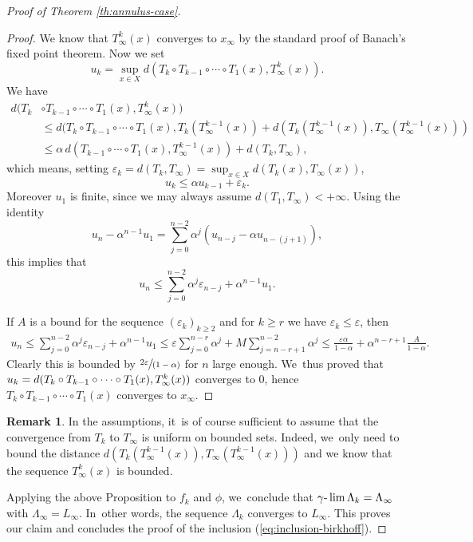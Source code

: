 \documentclass[10pt]{amsart}
\newcommand{\spfrac}[2]{\sfrac{#1}{(#2)}}
\theoremstyle{definition}
\newtheorem{rem}[thm]{Remark}
\begin{document}
\begin{proof}[Proof of Theorem \ref{th:annulus-case}]
\begin{proof}
We know that $T_{\infty}^{k}(x)$ converges to $x_{\infty}$ by the standard proof of Banach's fixed point theorem. Now we set
\[
u_{k}= \sup_{x\in X} d(T_{k}\circ T_{k-1}\circ \cdots \circ T_{1}(x), T_\infty^{k}(x)).
\]
We have
\begin{align*}
d(T_{k}&\circ T_{k-1}\circ \cdots \circ T_{1}(x),T_\infty^{k}(x)) \\
&\leq d(T_{k}\circ T_{k-1}\circ \cdots \circ T_{1}(x), T_{k}(T_\infty^{k-1}(x))+d (T_{k}(T_\infty^{k-1}(x)), T_\infty(T_\infty^{k-1}(x))) \\ &\leq
\alpha\, d(T_{k-1}\circ \cdots \circ T_{1}(x),T_\infty^{k-1}(x)) + d(T_{k}, T_\infty),
\end{align*}
which means, setting $ \varepsilon_{k}=d(T_{k},T_{\infty})=\sup_{x\in X}d(T_{k}(x),T_{\infty}(x))$,
\[
u_{k}\leq \alpha u_{k-1}+\varepsilon_{k}.
\]
Moreover $u_1$ is finite, since we may always assume $d(T_1,T_\infty)<+\infty$.
Using the identity
\[
u_{n}- \alpha^{n-1}u_{1}= \sum_{j=0}^{n-2} \alpha^{j}(u_{n-j}-\alpha u_{n-(j+1)}),
\]
this implies that
\[
u_{n}\leq \sum_{j=0}^{n-2} \alpha^{j} \varepsilon_{n-j}+ \alpha^{n-1}u_{1}.
\]

If $A$ is a bound for the sequence $(\varepsilon_k)_{k\geq 2}$ and for $k\geq r$ we have $ \varepsilon _{k}\leq \varepsilon $, then
\begin{gather*}u_{n}\leq \sum_{j=0}^{n-2} \alpha^{j} \varepsilon_{n-j} +\alpha^{n-1}u_{1}\leq \varepsilon \sum_{j=0}^{n-r}\alpha^{j}+ M\sum_{j=n-r+1}^{n-2}\alpha^{j}\leq \frac{ \varepsilon \alpha}{1- \alpha}+ \alpha^{n-r+1} \frac{A}{1-\alpha}.
\end{gather*}
Clearly this is bounded by $ \spfrac{2 \varepsilon}{1- \alpha}$ for $n$ large enough. We~thus proved that $u_{k}=d(T_{k}\circ\nobreak T_{k-1}\circ \cdots \circ T_{1}(x),T_\infty^{k}(x))$ converges to $0$, hence $T_{k}\circ T_{k-1}\circ \cdots \circ T_{1}(x)$ converges to $x_{\infty}$.
\end{proof}
\begin{rem}
In the assumptions, it~is of course sufficient to assume that the convergence from $T_{k}$ to $T_{\infty}$ is uniform on bounded sets. Indeed, we~only need to bound the distance $d(T_{k}(T_{\infty}^{k-1}(x)), T_{\infty}(T_{\infty}^{k-1}(x)))$ and we know that the sequence $ T_{\infty}^{k}(x)$ is bounded.
\end{rem}

Applying the above Proposition to $f_{k}$ and $\phi$, we~conclude that $\gamma\textup{-}\lim \Lambda_{k}=\Lambda_\infty$ with $\Lambda_\infty=L_\infty$. In~other words, the sequence $\Lambda_k$ converges to $L_\infty$. This proves our claim and concludes the proof of the inclusion (\ref{eq:inclusion-birkhoff}).


\end{proof}
\end{document}
